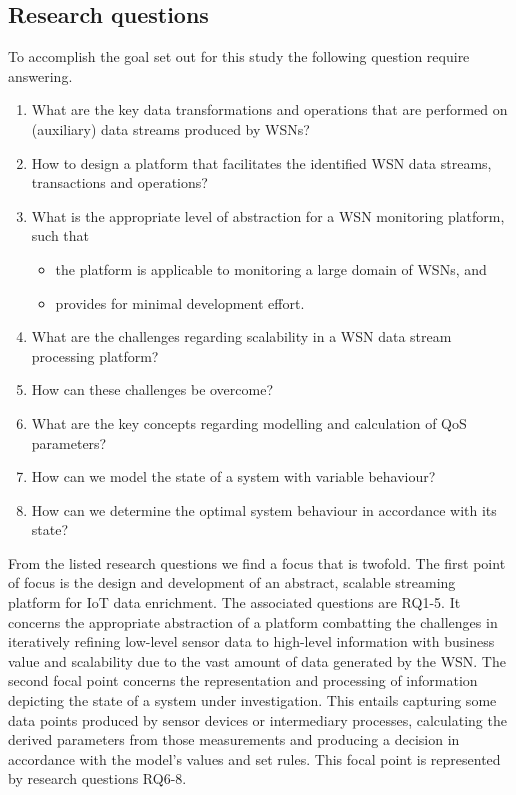 \subsection{Research questions}
To accomplish the goal set out for this study the following question require answering.
\begin{enumerate}[leftmargin=24pt, label=\small RQ\arabic*]
\nospace
\item\label{rq:identify_processes} What are the key data transformations and operations that are performed on (auxiliary) data streams produced by WSNs?
\item\label{rq:desing_processes} How to design a platform that facilitates the identified WSN data streams, transactions and operations?
\item\label{rq:abstraction} What is the appropriate level of abstraction for a WSN monitoring platform, such that
\begin{itemize}
\nospace
\item the platform is applicable to monitoring a large domain of WSNs, and
\item provides for minimal development effort.
\end{itemize}
\item\label{rq:identify_scale} What are the challenges regarding scalability in a WSN data stream processing platform?
\item\label{rq:design_scale} How can these challenges be overcome?
\item\label{rq:idenfity_model} What are the key concepts regarding modelling and calculation of QoS parameters?
\item\label{rq:design_model} How can we model the state of a system with variable behaviour?
\item\label{rq:solve_model} How can we determine the optimal system behaviour in accordance with its state?
\end{enumerate}

From the listed research questions we find a focus that is twofold. The first point of focus is the design and development of an abstract, scalable streaming platform for IoT data enrichment. The associated questions are RQ1-5. It concerns the appropriate abstraction of a platform combatting the challenges in iteratively refining low-level sensor data to high-level information with business value and scalability due to the vast amount of data generated by the WSN.  The second focal point concerns the representation and processing of information depicting the state of a system under investigation. This entails capturing some data points produced by sensor devices or intermediary processes, calculating the derived parameters from those measurements and producing a decision in accordance with the model's values and set rules. This focal point is represented by research questions RQ6-8.


